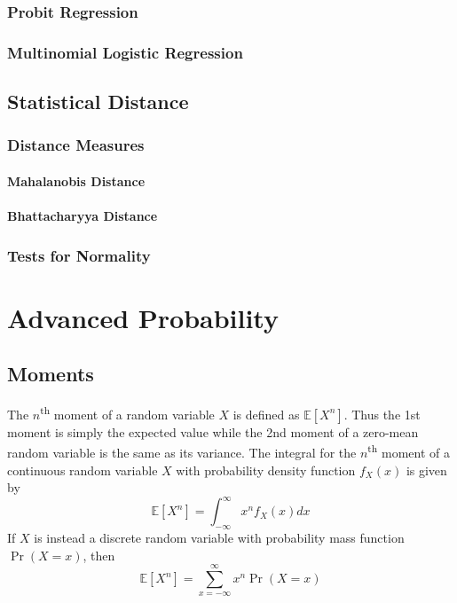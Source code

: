 \documentclass[11pt]{report} %
\begin{document}
\subsection{Probit Regression}

\subsection{Multinomial Logistic Regression}

\section{Statistical Distance}

\subsection{Distance Measures}

\subsubsection{Mahalanobis Distance}

\subsubsection{Bhattacharyya Distance}

\subsection{Tests for Normality}

\chapter{Advanced Probability}

\section{Moments}

The $n$\textsuperscript{th} moment of a random variable $X$ is defined as $\mathbb{E}\left[X^{n}\right]$. Thus the 1st moment is simply the expected value while the 2nd moment of a zero-mean random variable is the same as its variance. The integral for the $n$\textsuperscript{th} moment of a continuous random variable $X$ with probability density function $f_{X}\left(x\right)$ is given by
\begin{equation}
\mathbb{E}\left[X^{n}\right] = \int_{-\infty}^{\infty}x^{n}f_{X}\left(x\right)dx
\end{equation}
If $X$ is instead a discrete random variable with probability mass function $\operatorname{Pr}\left(X = x\right)$, then
\begin{equation}
\mathbb{E}\left[X^{n}\right] = \sum_{x = -\infty}^{\infty}x^{n}\operatorname{Pr}\left(X = x\right)
\end{equation}
\end{document}
